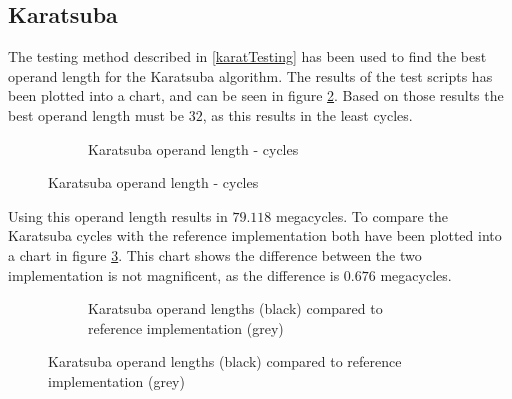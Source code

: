 \subsection{Karatsuba}
The testing method described in \ref{karatTesting} has been used to find the best operand length for the Karatsuba algorithm. The results of the test scripts has been plotted into a chart, and can be seen in figure \ref{karatsubafigure}. Based on those results the best operand length must be $32$, as this results in the least cycles. \\ 
\begin{figure}[H]
\begin{subfigure}{\textwidth}
    \centering
    \caption{Karatsuba operand length - cycles}
\label{karatsubafigure}
\end{subfigure}
\end{figure}
Using this operand length results in $79.118$ megacycles. To compare the Karatsuba cycles with the reference implementation both have been plotted into a chart in figure \ref{karatsubacomparison}. This chart shows the difference between the two implementation is not magnificent, as the difference is $0.676$ megacycles.\\

\begin{figure}[H]
\begin{subfigure}{\textwidth}
    \centering
    \caption{Karatsuba operand lengths (black) compared to reference implementation (grey)}
\end{subfigure}
\label{karatsubacomparison}
\end{figure}
    